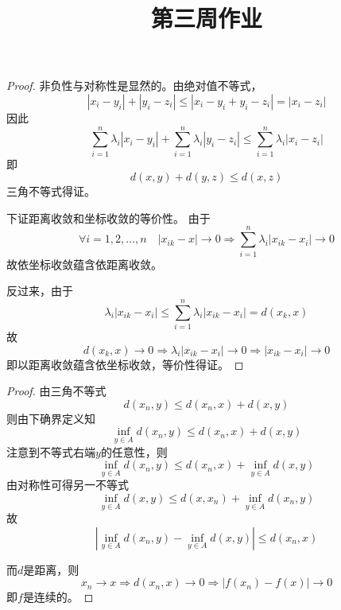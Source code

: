 \documentclass[cn]{homework}
\title{第三周作业}
\begin{document}
    \maketitle

    \problem
    \begin{proof}
        非负性与对称性是显然的。由绝对值不等式，
        \[|x_i-y_i|+|y_i-z_i|\leq|x_i-y_i+y_i-z_i|=|x_i-z_i|\]
        因此
        \[\sum_{i=1}^n\lambda_i|x_i-y_i|
        +\sum_{i=1}^n\lambda_i|y_i-z_i|
        \leq\sum_{i=1}^n\lambda_i|x_i-z_i|\]
        即
        \[d(x,y)+d(y,z)\leq d(x,z)\]
        三角不等式得证。

        下证距离收敛和坐标收敛的等价性。
        由于
        \[\forall i=1,2,\ldots,n\quad |x_{ik}-x|\to 0\Rightarrow
        \sum_{i=1}^n\lambda_i|x_{ik}-x_i|\to 0\]
        故依坐标收敛蕴含依距离收敛。

        反过来，由于
        \[\lambda_i|x_{ik}-x_i|\leq\sum_{i=1}^n\lambda_i|x_{ik}-x_i|
        =d(x_k,x)\]
        故
        \[d(x_k,x)\to 0\Rightarrow \lambda_i|x_{ik}-x_i|\to 0
        \Rightarrow |x_{ik}-x_i|\to 0\]
        即以距离收敛蕴含依坐标收敛，等价性得证。
    \end{proof}    
    
    \problem
    \begin{proof}
        \newcommand{\infy}{\inf_{y\in A}}
        \newcommand{\supy}{\sup_{y\in A}}
        由三角不等式
        \[d(x_n,y)\leq d(x_n,x)+d(x,y)\]
        则由下确界定义知
        \[\infy d(x_n,y)\leq d(x_n,x)+d(x,y)\]
        注意到不等式右端$y$的任意性，则
        \[\infy d(x_n,y)\leq d(x_n,x)+\infy d(x,y)\]
        由对称性可得另一不等式
        \[\infy d(x,y)\leq d(x,x_n)+\infy d(x_n,y)\]
        故
        \[\left|\infy d(x_n,y)-\infy d(x,y)\right|
        \leq d(x_n,x)\]

        而$d$是距离，则
        \[x_n\to x\Rightarrow d(x_n,x)\to 0
        \Rightarrow |f(x_n)-f(x)|\to 0\]
        即$f$是连续的。
    \end{proof}
\end{document}
